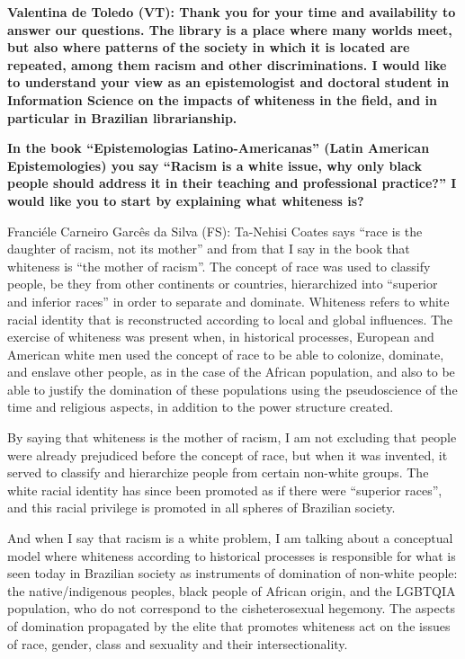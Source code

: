 \documentclass[a4paper,
fontsize=11pt,
oneside,
numbers=noperiodatend,
parskip=half-,
bibliography=totoc,
final
]{scrartcl}
\begin{document}
\textbf{Valentina de Toledo (VT): Thank you for your time and
availability to answer our questions. The library is a place where many
worlds meet, but also where patterns of the society in which it is
located are repeated, among them racism and other discriminations. I
would like to understand your view as an epistemologist and doctoral
student in Information Science on the impacts of whiteness in the field,
and in particular in Brazilian librarianship.}

\textbf{In the book \enquote{Epistemologias Latino-Americanas} (Latin
American Epistemologies) you say \enquote{Racism is a white issue, why only
black people should address it in their teaching and professional
practice?} I would like you to start by explaining what whiteness is?}

Franciéle Carneiro Garcês da Silva (FS): Ta-Nehisi Coates says
\enquote{race is the daughter of racism, not its mother} and from that I
say in the book that whiteness is \enquote{the mother of racism}. The
concept of race was used to classify people, be they from other
continents or countries, hierarchized into \enquote{superior and
inferior races} in order to separate and dominate. Whiteness refers to
white racial identity that is reconstructed according to local and
global influences. The exercise of whiteness was present when, in
historical processes, European and American white men used the concept
of race to be able to colonize, dominate, and enslave other people, as
in the case of the African population, and also to be able to justify
the domination of these populations using the pseudoscience of the time
and religious aspects, in addition to the power structure created.

By saying that whiteness is the mother of racism, I am not excluding
that people were already prejudiced before the concept of race, but when
it was invented, it served to classify and hierarchize people from
certain non-white groups. The white racial identity has since been
promoted as if there were \enquote{superior races}, and this racial
privilege is promoted in all spheres of Brazilian society.

And when I say that racism is a white problem, I am talking about a
conceptual model where whiteness according to historical processes is
responsible for what is seen today in Brazilian society as instruments
of domination of non-white people: the native/indigenous peoples, black
people of African origin, and the LGBTQIA population, who do not
correspond to the cisheterosexual hegemony. The aspects of domination
propagated by the elite that promotes whiteness act on the issues of
race, gender, class and sexuality and their intersectionality.
\end{document}
